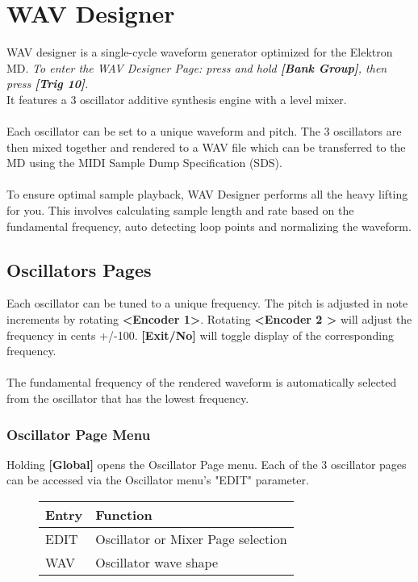 \chapter{WAV Designer}
WAV designer is a single-cycle waveform generator optimized for the Elektron MD. \textit{To enter the WAV Designer Page: press and hold \textbf{[Bank Group]}, then press \textbf{[Trig 10]}.}\\
It features a 3 oscillator additive synthesis engine with a level mixer.\\
\\
Each oscillator can be set to a unique waveform and pitch. The 3 oscillators are then mixed together and rendered to a WAV file which can be transferred to the MD using the MIDI Sample Dump Specification (SDS).\\
\\
To ensure optimal sample playback, WAV Designer performs all the heavy lifting for you. This involves calculating sample length and rate based on the fundamental frequency, auto detecting loop points and normalizing the waveform.
\section{Oscillators Pages}
Each oscillator can be tuned to a unique frequency. The pitch is adjusted in note increments by rotating \textbf{<Encoder 1>}. Rotating \textbf{<Encoder 2 >} will adjust the frequency in cents +/-100. \textbf{[Exit/No]} will toggle display of the corresponding frequency.\\
\\The fundamental frequency of the rendered waveform is automatically selected from the oscillator that has the lowest frequency.\\

\newpage
\subsection{Oscillator Page Menu}
Holding \textbf{[Global]} opens the Oscillator Page menu.
Each of the 3 oscillator pages can be accessed via the Oscillator menu's "EDIT" parameter.
\begin{figure}[hb]
    \begin{tabular}{|l|l|}
    \hline
    \rowcolor[HTML]{C0C0C0}
    Entry     & Function \\ \hline
    EDIT      & Oscillator or Mixer Page selection \\ \hline
    WAV       & Oscillator wave shape\\ \hline
    \end{tabular}
\end{figure}
\newpage



